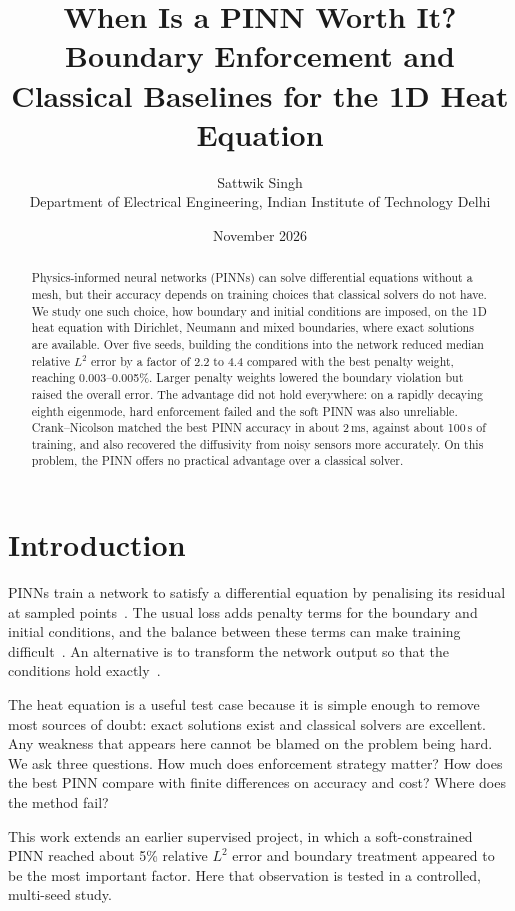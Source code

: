 \documentclass[10pt,a4paper]{article}
\title{\vspace{-1.5em}\Large\bfseries When Is a PINN Worth It?\\[2pt]
\large Boundary Enforcement and Classical Baselines for the 1D Heat Equation}
\author{Sattwik Singh\\
\small Department of Electrical Engineering, Indian Institute of Technology Delhi}
\date{\small November 2026}
\begin{document}
\maketitle

\begin{abstract}
\noindent Physics-informed neural networks (PINNs) can solve differential equations without a mesh, but their accuracy depends on training choices that classical solvers do not have. We study one such choice, how boundary and initial conditions are imposed, on the 1D heat equation with Dirichlet, Neumann and mixed boundaries, where exact solutions are available. Over five seeds, building the conditions into the network reduced median relative $L^2$ error by a factor of 2.2 to 4.4 compared with the best penalty weight, reaching 0.003--0.005\%. Larger penalty weights lowered the boundary violation but raised the overall error. The advantage did not hold everywhere: on a rapidly decaying eighth eigenmode, hard enforcement failed and the soft PINN was also unreliable. Crank--Nicolson matched the best PINN accuracy in about 2\,ms, against about 100\,s of training, and also recovered the diffusivity from noisy sensors more accurately. On this problem, the PINN offers no practical advantage over a classical solver.
\end{abstract}

\section{Introduction}
PINNs train a network to satisfy a differential equation by penalising its residual at sampled points~\cite{raissi2019}. The usual loss adds penalty terms for the boundary and initial conditions, and the balance between these terms can make training difficult~\cite{wang2021,krishnapriyan2021}. An alternative is to transform the network output so that the conditions hold exactly~\cite{lagaris1998,sukumar2022}.

The heat equation is a useful test case because it is simple enough to remove most sources of doubt: exact solutions exist and classical solvers are excellent. Any weakness that appears here cannot be blamed on the problem being hard. We ask three questions. How much does enforcement strategy matter? How does the best PINN compare with finite differences on accuracy and cost? Where does the method fail?

This work extends an earlier supervised project, in which a soft-constrained PINN reached about 5\% relative $L^2$ error and boundary treatment appeared to be the most important factor. Here that observation is tested in a controlled, multi-seed study.
\end{document}
